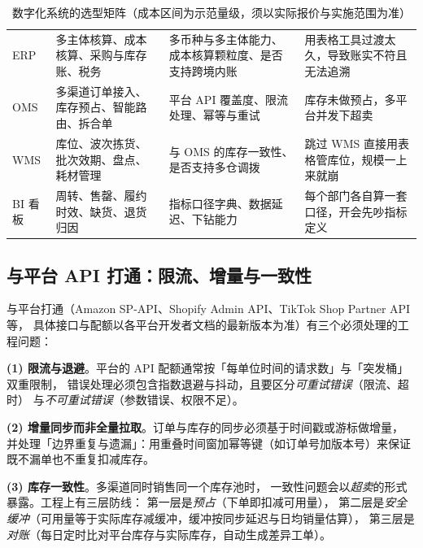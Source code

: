\begin{table}[htbp]
\centering
\caption{数字化系统的选型矩阵（成本区间为示范量级，须以实际报价与实施范围为准）}
\label{tab:sup-system}
\small
\begin{tabularx}{\textwidth}{L{1.9cm} L{3.1cm} L{2.8cm} Y}
\toprule
{} &  &  &  \\
\midrule
ERP & 多主体核算、成本核算、采购与库存账、税务 & 多币种与多主体能力、成本核算颗粒度、是否支持跨境内账 & 用表格工具过渡太久，导致账实不符且无法追溯 \\
OMS & 多渠道订单接入、库存预占、智能路由、拆合单 & 平台 API 覆盖度、限流处理、幂等与重试 & 库存未做预占，多平台并发下超卖 \\
WMS & 库位、波次拣货、批次效期、盘点、耗材管理 & 与 OMS 的库存一致性、是否支持多仓调拨 & 跳过 WMS 直接用表格管库位，规模一上来就崩 \\
BI 看板 & 周转、售罄、履约时效、缺货、退货归因 & 指标口径字典、数据延迟、下钻能力 & 每个部门各自算一套口径，开会先吵指标定义 \\
\bottomrule
\end{tabularx}
\end{table}

\subsection{与平台 API 打通：限流、增量与一致性}

与平台打通（Amazon SP-API、Shopify Admin API、TikTok Shop Partner API 等，
具体接口与配额以各平台开发者文档的最新版本为准）有三个必须处理的工程问题：

\textbf{(1) 限流与退避}。平台的 API 配额通常按「每单位时间的请求数」与「突发桶」双重限制，
错误处理必须包含指数退避与抖动，且要区分\emph{可重试错误}（限流、超时）
与\emph{不可重试错误}（参数错误、权限不足）。

\textbf{(2) 增量同步而非全量拉取}。订单与库存的同步必须基于时间戳或游标做增量，
并处理「边界重复与遗漏」：用重叠时间窗加幂等键（如订单号加版本号）来保证既不漏单也不重复扣减库存。

\textbf{(3) 库存一致性}。多渠道同时销售同一个库存池时，
一致性问题会以\emph{超卖}的形式暴露。工程上有三层防线：
第一层是\emph{预占}（下单即扣减可用量），
第二层是\emph{安全缓冲}（可用量等于实际库存减缓冲，缓冲按同步延迟与日均销量估算），
第三层是\emph{对账}（每日定时比对平台库存与实际库存，自动生成差异工单）。

